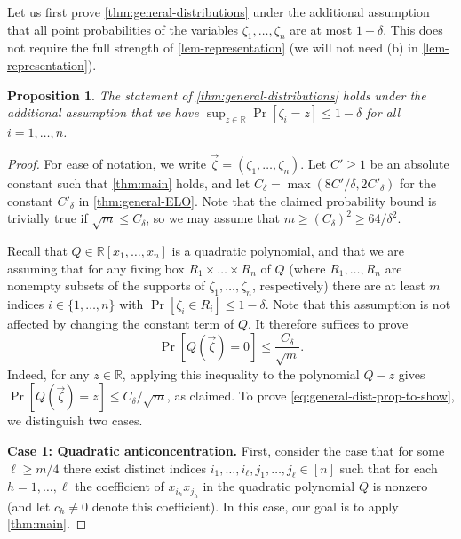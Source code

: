 \documentclass[english]{article}
\newtheorem{proposition}[theorem]{Proposition}
\theoremstyle{remark}
\numberwithin{equation}{section}
\numberwithin{figure}{section}
\newcommand{\RR}{\mathbb{R}}
\begin{document}
Let us first prove \cref{thm:general-distributions} under the additional assumption that all point probabilities of the variables $\zeta_1,\dots,\zeta_n$ are at most $1-\delta$. This does not require the full strength of \cref{lem-representation} (we will not need (b) in \cref{lem-representation}).

\begin{proposition}\label{prop:general-distributions-assumption}
The statement of \cref{thm:general-distributions} holds under the additional assumption that we have $\sup_{z\in \RR}\Pr[\zeta_i=z]\le 1-\delta$ for all $i=1,\dots,n$.
\end{proposition}

\begin{proof}
    For ease of notation, we write $\vec \zeta=(\zeta_1,\dots,\zeta_n)$. Let $C'\ge 1$ be an absolute constant such that \cref{thm:main} holds, and let $C_\delta=\max(8C'/\delta,2C'_\delta)$ for the constant $C'_\delta$ in \cref{thm:general-ELO}. Note that the claimed probability bound is trivially true if $\sqrt{m}\le C_\delta$, so we may assume that $m\ge (C_\delta)^2\ge 64/\delta^2$.
    
    Recall that $Q\in \RR[x_1,\dots,x_n]$ is a quadratic polynomial, and that we are assuming that for any fixing box $R_1\times \dots\times R_n$ of $Q$ (where $R_1,\dots,R_n$ are nonempty subsets of the supports of $\zeta_1,\dots,\zeta_n$, respectively) there are at least $m$ indices $i\in \{1,\dots,n\}$ with $\Pr[\zeta_i\in R_i]\le 1-\delta$. Note that this assumption is not affected by changing the constant term of $Q$. It therefore suffices to prove
    \begin{equation}\label{eq:general-dist-prop-to-show}
    \Pr[Q(\vec \zeta)=0]\le\frac{C_\delta}{\sqrt{m}}.
    \end{equation}
    Indeed, for any $z\in \RR$, applying this inequality to the polynomial $Q-z$ gives $\Pr[Q(\vec \zeta)=z]\le C_\delta/\sqrt{m}$, as claimed. To prove \cref{eq:general-dist-prop-to-show}, we distinguish two cases.

    \textbf{Case 1: Quadratic anticoncentration.} First, consider the case that for some $\ell\ge m/4$ there exist distinct indices $i_1,\dots,i_\ell,j_1,\dots,j_\ell\in [n]$ such that for each $h=1,\dots,\ell$ the coefficient of $x_{i_h}x_{j_h}$ in the quadratic polynomial $Q$ is nonzero (and let $c_h\ne 0$ denote this coefficient). In this case, our goal is to apply \cref{thm:main}.


\end{proof}
\end{document}

